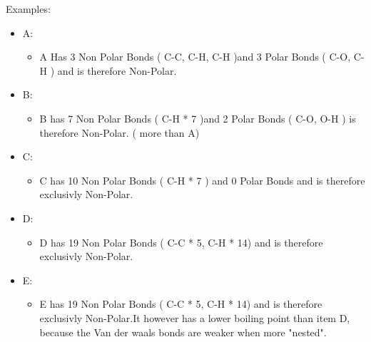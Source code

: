 \documentclass{article}
\begin{document}
\clearpage
Examples:\hfill
\begin{itemize}
    \item A:  \hspace{1cm}
    \begin{itemize}
        \item A Has 3 Non Polar Bonds ( C-C, C-H, C-H )\hfill\break and 3 Polar Bonds ( C-O, C-H ) and is therefore Non-Polar.
    \end{itemize}
    \item B:  
    \begin{itemize}
        \item B has 7 Non Polar Bonds ( C-H * 7 )\hfill\break and 2 Polar Bonds ( C-O, O-H ) is therefore Non-Polar. ( more than A)
    \end{itemize}
    \item C:  
    \begin{itemize}
        \item C has 10 Non Polar Bonds ( C-H * 7 ) and 0 Polar Bonds and is therefore exclusivly Non-Polar.
    \end{itemize}
    \item D:  
    \begin{itemize}
        \item D  has 19 Non Polar Bonds ( C-C * 5, C-H * 14) and is therefore exclusivly Non-Polar.
    \end{itemize}
    \item E:  
    \begin{itemize}
        \item E  has 19 Non Polar Bonds ( C-C * 5, C-H * 14) and is therefore exclusivly Non-Polar.\hfill\break It however has a lower boiling point than item D, because the Van der waals bonds are weaker when more "nested".
    \end{itemize}
\end{itemize}
\end{document}
